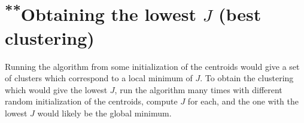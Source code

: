 \documentclass{article}
\begin{document}
\section{\textsuperscript{**}Obtaining the lowest \(J\) (best clustering)}
Running the algorithm from some initialization of the centroids would give a set of clusters which correspond to a local minimum of \(J\). To obtain the clustering which would give the lowest \(J\), run the algorithm many times with different random initialization of the centroids, compute \(J\) for each, and the one with the lowest \(J\) would likely be the global minimum.
\end{document}
